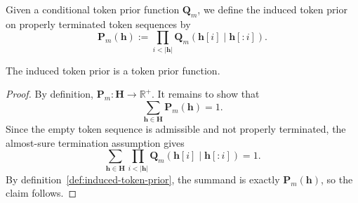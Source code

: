 \begin{definition}
\label{def:induced-token-prior}
    Given a conditional token prior function $\mathbf{Q}_m$, we define the induced token
    prior on properly terminated token sequences by
    \[
    \mathbf{P}_m(\mathbf{h})
    :=
    \prod_{i < |\mathbf{h}|} \mathbf{Q}_m(\mathbf{h}[i] \mid \mathbf{h}[:i]).
    \]
\end{definition}

\begin{proposition}
    The induced token prior is a token prior function.
\end{proposition}
\begin{proof}
    By definition, $\mathbf{P}_m : \mathbf{H} \to \mathbb{R}^+$.
    It remains to show that
    \[
    \sum_{\mathbf{h} \in \mathbf{H}} \mathbf{P}_m(\mathbf{h}) = 1.
    \]
    Since the empty token sequence is admissible and not properly terminated, the
    almost-sure termination assumption gives
    \[
    \sum_{\mathbf{h} \in \mathbf{H}}
    \prod_{i < |\mathbf{h}|} \mathbf{Q}_m(\mathbf{h}[i] \mid \mathbf{h}[:i])
    = 1.
    \]
    By definition~\ref{def:induced-token-prior}, the summand is exactly
    $\mathbf{P}_m(\mathbf{h})$, so the claim follows.
\end{proof}

